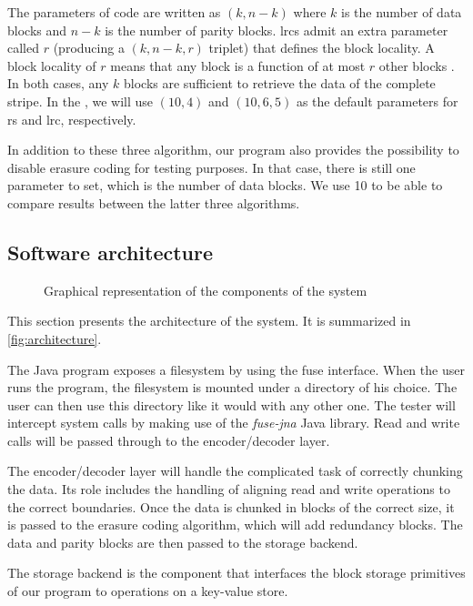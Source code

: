 The parameters of  code are written as $(k,n-k)$ where $k$ is the number of data blocks and $n-k$ is the number of parity blocks.
\acp{lrc} admit an extra parameter called $r$ (producing a $(k,n-k,r)$ triplet) that defines the block locality.
A block locality of $r$ means that any block is a function of at most $r$ other blocks \autocite{XorbasVLDB}.
In both cases, any $k$ blocks are sufficient to retrieve the data of the complete stripe.
In the , we will use $(10,4)$ and $(10,6,5)$ as the default parameters for \ac{rs} and \ac{lrc}, respectively.

In addition to these three algorithm, our program also provides the possibility to disable erasure coding for testing purposes.
In that case, there is still one parameter to set, which is the number of data blocks.
We use 10 to be able to compare results between the latter three algorithms.

\subsection{Software architecture}
\label{subsec:architecture}

\begin{figure*}
	\centering
	
	\caption{Graphical representation of the components of the system}
	\label{fig:architecture}
\end{figure*}

This section presents the architecture of the system.
It is summarized in \autoref{fig:architecture}.

The Java program exposes a filesystem by using the \ac{fuse} interface.
When the user runs the program, the filesystem is mounted under a directory of his choice.
The user can then use this directory like it would with any other one.
The tester will intercept system calls by making use of the \textit{fuse-jna} \autocite{fuse-jna} Java library.
Read and write calls will be passed through to the encoder/decoder layer.

The encoder/decoder layer will handle the complicated task of correctly chunking the data.
Its role includes the handling of aligning read and write operations to the correct boundaries.
Once the data is chunked in blocks of the correct size, it is passed to the erasure coding algorithm, which will add redundancy blocks.
The data and parity blocks are then passed to the storage backend.

The storage backend is the component that interfaces the block storage primitives of our program to operations on a key-value store.

